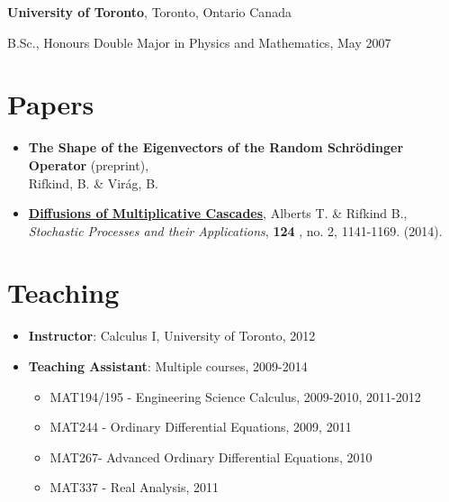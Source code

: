 \documentclass[margin,line]{res}
\newenvironment{list1}{
  \begin{list}{\ding{113}}{%
      \setlength{\itemsep}{0in}
      \setlength{\parsep}{0in} \setlength{\parskip}{0in}
      \setlength{\topsep}{0in} \setlength{\partopsep}{0in} 
      \setlength{\leftmargin}{0.17in}}}{\end{list}}
\begin{document}
\begin{resume}
{\bf University of Toronto}, Toronto, Ontario Canada\\
\vspace*{-.1in}
\begin{list1}
\item[] B.Sc., Honours Double Major in Physics and Mathematics,  May 2007
\end{list1}

\section{\sc Papers}
\begin{itemize}
\item {\bf The Shape of the Eigenvectors of the Random Schr\"{o}dinger Operator }(preprint), \\
Rifkind, B. \& Vir\'{a}g, B. \\
\vspace*{-0.1in}
\item \href{http://arxiv.org/abs/1205.2413}{\bf Diffusions of Multiplicative Cascades}, Alberts T. \& Rifkind B.,\\ {\it Stochastic Processes and their Applications}, {\bf 124} , no. 2, 1141-1169. (2014).
\end{itemize}

\section{\sc Teaching}
\begin{itemize}
\item {\bf Instructor}: Calculus I, University of Toronto, 2012
\item {\bf Teaching Assistant}: Multiple courses, 2009-2014
\begin{itemize}
\item MAT194/195 - Engineering Science Calculus, 2009-2010, 2011-2012 \\
\vspace{-0.2in}
\item MAT244 - Ordinary Differential Equations, 2009, 2011\\
\vspace{-0.2in}
\item MAT267- Advanced Ordinary Differential Equations, 2010 \\
\vspace{-0.2in}
\item MAT337 - Real Analysis, 2011
\end{itemize}
\end{itemize}



\end{resume}
\end{document}
